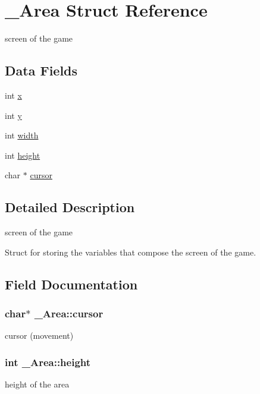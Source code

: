 \hypertarget{struct__Area}{}\section{\+\_\+\+Area Struct Reference}
\label{struct__Area}


screen of the game  


\subsection*{Data Fields}
\begin{DoxyCompactItemize}
\item 
int \hyperlink{struct__Area_a093b8c2929094bac88bbf5ee7db85573}{x}
\item 
int \hyperlink{struct__Area_a867e601f05480db03237c3a17d4c77f8}{y}
\item 
int \hyperlink{struct__Area_aa2f753fc3d254821603ac4512db814f1}{width}
\item 
int \hyperlink{struct__Area_a22627de8e529d631c17157f1f68cb5ac}{height}
\item 
char $\ast$ \hyperlink{struct__Area_aa042b0549789b75fd133b67ad7d0fd9d}{cursor}
\end{DoxyCompactItemize}


\subsection{Detailed Description}
screen of the game 

Struct for storing the variables that compose the screen of the game. 

\subsection{Field Documentation}
\subsubsection[{\texorpdfstring{cursor}{cursor}}]{\setlength{\rightskip}{0pt plus 5cm}char$\ast$ \+\_\+\+Area\+::cursor}\hypertarget{struct__Area_aa042b0549789b75fd133b67ad7d0fd9d}{}\label{struct__Area_aa042b0549789b75fd133b67ad7d0fd9d}
cursor (movement) 
\subsubsection[{\texorpdfstring{height}{height}}]{\setlength{\rightskip}{0pt plus 5cm}int \+\_\+\+Area\+::height}\hypertarget{struct__Area_a22627de8e529d631c17157f1f68cb5ac}{}\label{struct__Area_a22627de8e529d631c17157f1f68cb5ac}
height of the area 
